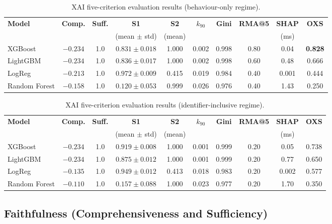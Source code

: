 \documentclass[12pt,a4paper]{report}
\begin{document}
\begin{table}[H]
\centering
\caption{XAI five-criterion evaluation results (behaviour-only regime).}
\label{tab:xai-behav}
\small
\begin{tabular}{lccccccccc}
\toprule
\textbf{Model} & \textbf{Comp.} & \textbf{Suff.} & \textbf{S1} & \textbf{S2} & \textbf{$k_{90}$} & \textbf{Gini} & \textbf{RMA@5} & \textbf{SHAP} & \textbf{OXS} \\
 & & & (mean $\pm$ std) & (mean) & & & & (ms) & \\
\midrule
XGBoost & $-0.234$ & 1.0 & $0.831 \pm 0.018$ & 1.000 & 0.002 & 0.998 & 0.80 & 0.04 & \textbf{0.828} \\
LightGBM & $-0.234$ & 1.0 & $0.836 \pm 0.017$ & 1.000 & 0.002 & 0.998 & 0.60 & 0.48 & 0.666 \\
LogReg & $-0.213$ & 1.0 & $0.972 \pm 0.009$ & 0.415 & 0.019 & 0.984 & 0.40 & 0.001 & 0.444 \\
Random Forest & $-0.158$ & 1.0 & $0.120 \pm 0.053$ & 0.999 & 0.026 & 0.976 & 0.40 & 1.43 & 0.250 \\
\bottomrule
\end{tabular}
\end{table}

\begin{table}[H]
\centering
\caption{XAI five-criterion evaluation results (identifier-inclusive regime).}
\label{tab:xai-ident}
\small
\begin{tabular}{lccccccccc}
\toprule
\textbf{Model} & \textbf{Comp.} & \textbf{Suff.} & \textbf{S1} & \textbf{S2} & \textbf{$k_{90}$} & \textbf{Gini} & \textbf{RMA@5} & \textbf{SHAP} & \textbf{OXS} \\
 & & & (mean $\pm$ std) & (mean) & & & & (ms) & \\
\midrule
XGBoost & $-0.234$ & 1.0 & $0.919 \pm 0.008$ & 1.000 & 0.001 & 0.999 & 0.20 & 0.05 & 0.738 \\
LightGBM & $-0.234$ & 1.0 & $0.875 \pm 0.012$ & 1.000 & 0.001 & 0.999 & 0.20 & 0.77 & 0.650 \\
LogReg & $-0.135$ & 1.0 & $0.949 \pm 0.012$ & 0.413 & 0.018 & 0.983 & 0.20 & 0.002 & 0.577 \\
Random Forest & $-0.110$ & 1.0 & $0.157 \pm 0.088$ & 1.000 & 0.023 & 0.977 & 0.20 & 1.70 & 0.350 \\
\bottomrule
\end{tabular}
\end{table}

\subsection{Faithfulness (Comprehensiveness and Sufficiency)}
\label{sec:faith-results}
\end{document}
